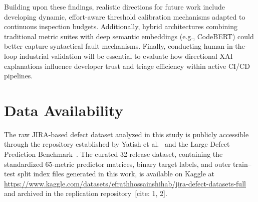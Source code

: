 \documentclass[conference]{IEEEtran}
\begin{document}
Building upon these findings, realistic directions for future work include developing dynamic, effort-aware threshold calibration mechanisms adapted to continuous inspection budgets. Additionally, hybrid architectures combining traditional metric suites with deep semantic embeddings (e.g., CodeBERT) could better capture syntactical fault mechanisms. Finally, conducting human-in-the-loop industrial validation will be essential to evaluate how directional XAI explanations influence developer trust and triage efficiency within active CI/CD pipelines.

\section*{Data Availability}

The raw JIRA-based defect dataset analyzed in this study is publicly accessible through the repository established by Yatish et al.~\cite{yatish2019affected} and the Large Defect Prediction Benchmark~\cite{tantithamthavorn2022benchmark}. The curated 32-release dataset, containing the standardized 65-metric predictor matrices, binary target labels, and outer train--test split index files generated in this work, is available on Kaggle at \url{https://www.kaggle.com/datasets/efrathhossainshihab/jira-defect-datasets-full} and archived in the replication repository~\cite{yatish2019affected}[cite: 1, 2].
\end{document}
